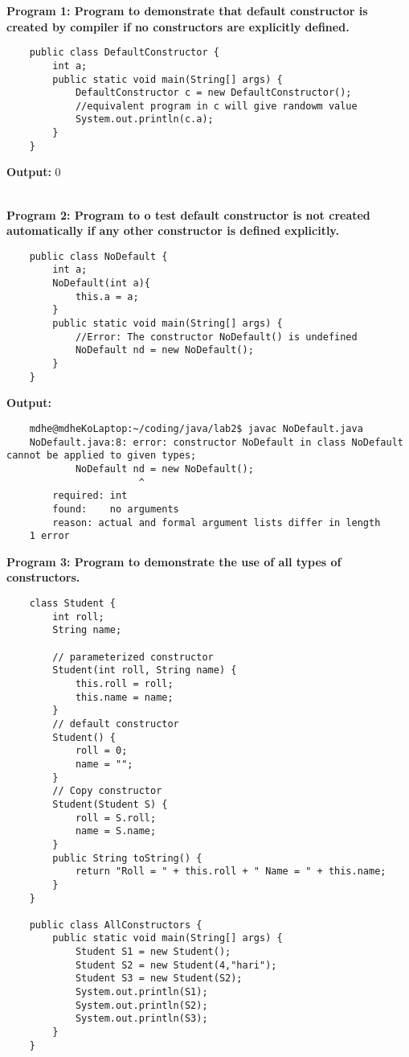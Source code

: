 \documentclass{book}
\begin{document}
\newpage
\par
\textbf{Program 1: Program to demonstrate that default constructor is created by compiler if no constructors are explicitly defined.}
\begin{verbatim}
    public class DefaultConstructor {
        int a;
        public static void main(String[] args) {
            DefaultConstructor c = new DefaultConstructor();
            //equivalent program in c will give randowm value
            System.out.println(c.a);
        }
    }
\end{verbatim}
\par
\textbf{Output:}
0
\\
\\
\par
\textbf{Program 2: Program to o test default constructor is not  created automatically if any other constructor is defined explicitly.}
\begin{verbatim}
    public class NoDefault {
        int a;
        NoDefault(int a){
            this.a = a;
        }
        public static void main(String[] args) {
            //Error: The constructor NoDefault() is undefined
            NoDefault nd = new NoDefault();
        }
    }
\end{verbatim}
\par
\textbf{Output:}
\begin{verbatim}
    mdhe@mdheKoLaptop:~/coding/java/lab2$ javac NoDefault.java
    NoDefault.java:8: error: constructor NoDefault in class NoDefault cannot be applied to given types;
            NoDefault nd = new NoDefault();
                       ^
        required: int
        found:    no arguments
        reason: actual and formal argument lists differ in length
    1 error
\end{verbatim}
\par
\textbf{Program 3: Program to demonstrate the use of all types of constructors.}
\begin{verbatim}
    class Student {
        int roll;
        String name;

        // parameterized constructor
        Student(int roll, String name) {
            this.roll = roll;
            this.name = name;
        }
        // default constructor
        Student() {
            roll = 0;
            name = "";
        }
        // Copy constructor
        Student(Student S) {
            roll = S.roll;
            name = S.name;
        }
        public String toString() {
            return "Roll = " + this.roll + " Name = " + this.name;
        }
    }

    public class AllConstructors {
        public static void main(String[] args) {
            Student S1 = new Student();
            Student S2 = new Student(4,"hari");
            Student S3 = new Student(S2);
            System.out.println(S1);
            System.out.println(S2);
            System.out.println(S3);
        }
    }
\end{verbatim}
\end{document}
